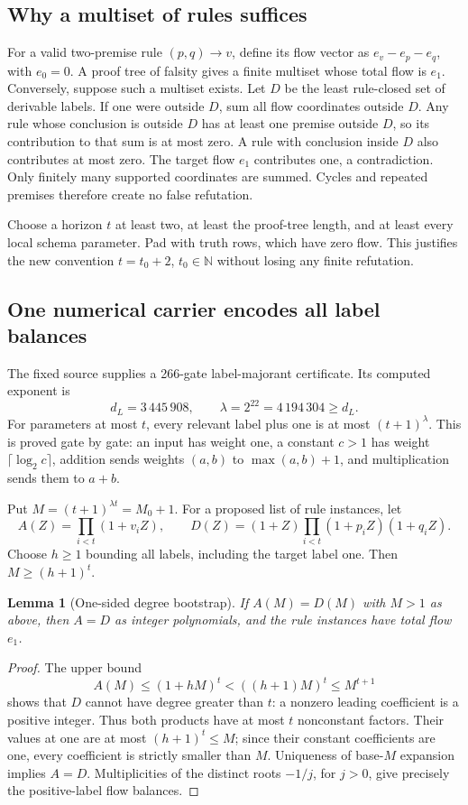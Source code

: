 \documentclass[11pt]{article}
\newtheorem{lemma}[theorem]{Lemma}
\theoremstyle{definition}\newtheorem{definition}[theorem]{Definition}
\newcommand{\N}{\mathbb N}\newcommand{\Z}{\mathbb Z}\newcommand{\Q}{\mathbb Q}
\begin{document}
\subsection{Why a multiset of rules suffices}
For a valid two-premise rule $(p,q)\to v$, define its flow vector as
$e_v-e_p-e_q$, with $e_0=0$. A proof tree of falsity gives a finite
multiset whose total flow is $e_1$. Conversely, suppose such a multiset
exists. Let $D$ be the least rule-closed set of derivable labels. If one
were outside $D$, sum all flow coordinates outside $D$. Any rule whose
conclusion is outside $D$ has at least one premise outside $D$, so its
contribution to that sum is at most zero. A rule with conclusion inside
$D$ also contributes at most zero. The target flow $e_1$ contributes one,
a contradiction. Only finitely many supported coordinates are summed.
Cycles and repeated premises therefore create no false refutation.

Choose a horizon $t$ at least two, at least the proof-tree length, and at
least every local schema parameter. Pad with truth rows, which have zero
flow. This justifies the new convention $t=t_0+2$, $t_0\in\N$ without
losing any finite refutation.

\subsection{One numerical carrier encodes all label balances}
The fixed source supplies a 266-gate label-majorant certificate. Its
computed exponent is
\[
 d_L=3\,445\,908,\qquad \lambda=2^{22}=4\,194\,304\ge d_L.
\]
For parameters at most $t$, every relevant label plus one is at most
$(t+1)^\lambda$. This is proved gate by gate: an input has weight one,
a constant $c>1$ has weight $\lceil\log_2c\rceil$, addition sends weights
$(a,b)$ to $\max(a,b)+1$, and multiplication sends them to $a+b$.

Put $M=(t+1)^{\lambda t}=M_0+1$. For a proposed list of rule instances,
let
\[
 A(Z)=\prod_{i<t}(1+v_iZ),\qquad
 D(Z)=(1+Z)\prod_{i<t}(1+p_iZ)(1+q_iZ).
\]
Choose $h\ge1$ bounding all labels, including the target label one.
Then $M\ge(h+1)^t$.
\begin{lemma}[One-sided degree bootstrap]\label{lem:carrier}
If $A(M)=D(M)$ with $M>1$ as above, then $A=D$ as integer polynomials,
and the rule instances have total flow $e_1$.
\end{lemma}
\begin{proof}
The upper bound
\[
 A(M)\le(1+hM)^t<((h+1)M)^t\le M^{t+1}
\]
shows that $D$ cannot have degree greater than $t$: a nonzero leading
coefficient is a positive integer. Thus both products have at most $t$
nonconstant factors. Their values at one are at most $(h+1)^t\le M$;
since their constant coefficients are one, every coefficient is strictly
smaller than $M$. Uniqueness of base-$M$ expansion implies $A=D$.
Multiplicities of the distinct roots $-1/j$, for $j>0$, give precisely
the positive-label flow balances.
\end{proof}
\end{document}
